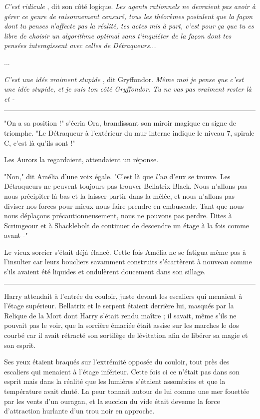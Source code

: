 \emph{C'est ridicule} , dit son côté logique. \emph{Les agents rationnels ne devraient pas avoir à gérer ce genre de raisonnement censuré, tous les théorèmes postulent que la façon dont tu penses n'affecte pas la réalité, tes actes mis à part, c'est pour ça que tu es libre de choisir un algorithme optimal sans t'inquiéter de la façon dont tes pensées interagissent avec celles de Détraqueurs...} 

...

\emph{C'est une idée vraiment stupide} , dit Gryffondor. \emph{Même moi je pense que c'est une idée stupide, et je suis ton côté Gryffondor. Tu ne vas pas vraiment rester là et -} 
\par\noindent\rule{\textwidth}{0.4pt}
"On a sa position !" s'écria Ora, brandissant son miroir magique en signe de triomphe. "Le Détraqueur à l'extérieur du mur interne indique le niveau 7, spirale C, c'est là qu'ils sont !"

Les Aurors la regardaient, attendaient un réponse.

"Non," dit Amélia d'une voix égale. "C'est là que \emph{l'un}  d'eux se trouve. Les Détraqueurs ne peuvent toujours pas trouver Bellatrix Black. Nous n'allons pas nous précipiter là-bas et la laisser partir dans la mêlée, et nous n'allons pas diviser nos forces pour mieux nous faire prendre en embuscade. Tant que nous nous déplaçons précautionneusement, nous ne pouvons pas perdre. Dites à Scrimgeour et à Shacklebolt de continuer de descendre un étage à la fois comme avant -"

Le vieux sorcier s'était déjà élancé. Cette fois Amélia ne se fatigua même pas à l'insulter car leurs boucliers savamment construits s'écartèrent à nouveau comme s'ils avaient été liquides et ondulèrent doucement dans son sillage.
\par\noindent\rule{\textwidth}{0.4pt}
Harry attendait à l'entrée du couloir, juste devant les escaliers qui menaient à l'étage supérieur. Bellatrix et le serpent étaient derrière lui, masqués par la Relique de la Mort dont Harry s'était rendu maître ; il savait, même s'ils ne pouvait pas le voir, que la sorcière émaciée était assise sur les marches le dos courbé car il avait rétracté son sortilège de lévitation afin de libérer sa magie et son esprit.

Ses yeux étaient braqués sur l'extrémité opposée du couloir, tout près des escaliers qui menaient à l'étage inférieur. Cette fois ci ce n'était pas dans son esprit mais dans la réalité que les lumières s'étaient assombries et que la température avait chuté. La peur tonnait autour de lui comme une mer fouettée par les vents d'un ouragan, et la succion du vide était devenue la force d'attraction hurlante d'un trou noir en approche.

